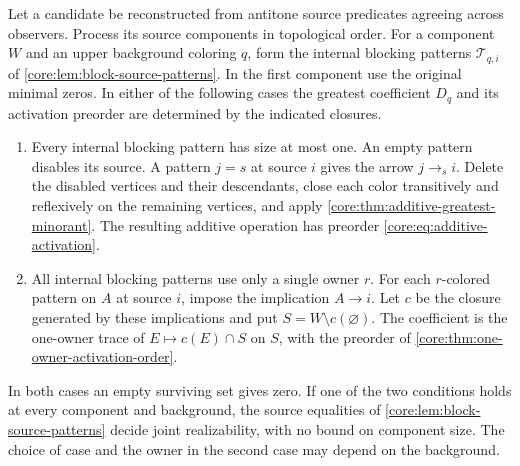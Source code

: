 \begin{theorem}
\label{core:thm:conditional-component-capture}
Let a candidate be reconstructed from antitone source predicates
agreeing across observers. Process its source components in
topological order. For a component $W$ and an upper background
coloring $q$, form the internal blocking patterns
$\mathcal T_{q,i}$ of \cref{core:lem:block-source-patterns}.
In the first component use the original minimal zeros.
In either of the following cases the greatest coefficient $D_q$
and its activation preorder are determined by the indicated closures.
\begin{enumerate}
\item Every internal blocking pattern has size at most one.
An empty pattern disables its source. A pattern $j=s$ at source $i$
gives the arrow $j\to_s i$. Delete the disabled vertices and their
descendants, close each color transitively and reflexively on the
remaining vertices, and apply \cref{core:thm:additive-greatest-minorant}.
The resulting additive operation has preorder
\eqref{core:eq:additive-activation}.
\item All internal blocking patterns use only a single owner $r$.
For each $r$-colored pattern on $A$ at source $i$, impose the
implication $A\to i$. Let $c$ be the closure generated by these
implications and put $S=W\setminus c(\varnothing)$. The coefficient
is the one-owner trace of $E\mapsto c(E)\cap S$ on $S$, with the
preorder of \cref{core:thm:one-owner-activation-order}.
\end{enumerate}
In both cases an empty surviving set gives zero. If one of the two
conditions holds at every component and background, the source
equalities of \cref{core:lem:block-source-patterns} decide joint
realizability, with no bound on component size. The choice of case
and the owner in the second case may depend on the background.
\end{theorem}
